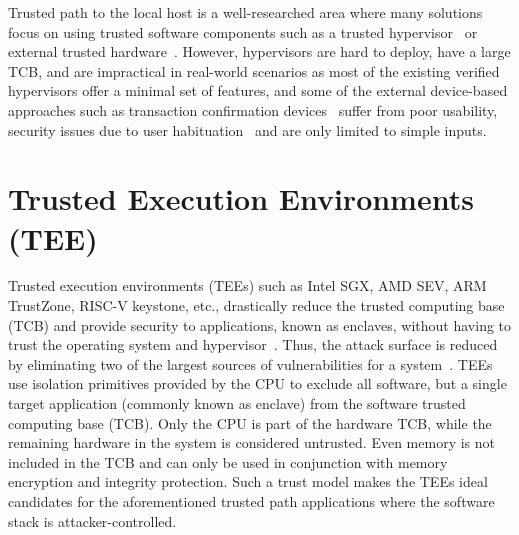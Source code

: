 Trusted path to the local host is a well-researched area where many solutions focus on using trusted software components such as a trusted hypervisor~\cite{zhou2012building} or external trusted hardware~\cite{filyanov2011uni,weigold2011secure,McCPerRei2006,mannan2007using,Fidelius}. However, hypervisors are hard to deploy, have a large TCB, and are impractical in real-world scenarios as most of the existing verified hypervisors offer a minimal set of features, and some of the external device-based approaches such as transaction confirmation devices~\cite{filyanov2011uni,weigold2011secure} suffer from poor usability, security issues due to user habituation~\cite{anderson2016warning} and are only limited to simple inputs.


\section{Trusted Execution Environments (TEE)}

Trusted execution environments (TEEs) such as Intel SGX, AMD SEV, ARM TrustZone, RISC-V keystone, etc., drastically reduce the trusted computing base (TCB) and provide security to applications, known as enclaves, without having to trust the operating system and hypervisor~\cite{costan2016intel,winter2008trusted,costan2016sanctum}. Thus, the attack surface is reduced by eliminating two of the largest sources of vulnerabilities for a system~\cite{checkoway2013iago,suzaki2011memory}. TEEs use isolation primitives provided by the CPU to exclude all software, but a single target application (commonly known as enclave) from the software trusted computing base (TCB). Only the CPU is part of the hardware TCB, while the remaining hardware in the system is considered untrusted. Even memory is not included in the TCB and can only be used in conjunction with memory encryption and integrity protection. Such a trust model makes the TEEs ideal candidates for the aforementioned trusted path applications where the software stack is attacker-controlled. 


